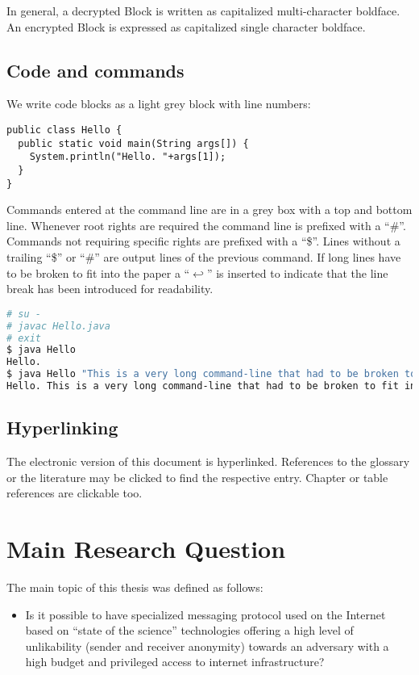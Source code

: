 In general, a decrypted Block is written as capitaliz\-ed multi-cha\-rac\-ter boldface. An encrypted Block is expressed as capitalized sing\-le cha\-rac\-ter boldface.

\section{Code and commands}
We write code blocks as a light grey block with line numbers:

\begin{lstlisting}
public class Hello {
  public static void main(String args[]) {
    System.println("Hello. "+args[1]);
  }
}
\end{lstlisting}

Commands entered at the command line are in a grey box with a top and bottom line. Whenever root rights are required the command line is prefixed with a ``\#''. Commands not requiring specific rights are prefixed with a ``\$''. Lines without a trailing ``\$'' or ``\#'' are output lines of the previous command. If long lines have to be broken to fit into the paper a ``$\hookleftarrow$'' is inserted to indicate that the line break has been introduced for readability.

\begin{lstlisting}[language=bash]
# su -
# javac Hello.java 
# exit
$ java Hello
Hello.
$ java Hello "This is a very long command-line that had to be broken to fit into the code box displayed on this page."
Hello. This is a very long command-line that had to be broken to fit into the code box displayed on this page.
\end{lstlisting}

\section{Hyperlinking}
The electronic version of this document is hyperlinked. References to the glossary or the literature may be clicked to find the respective entry. Chapter or table references are clickable too. 

\chapter{Main Research Question}
The main topic of this thesis was defined as follows:
\begin{itemize}
	\item Is it possible to have specialized messaging protocol used on the Internet based on ``state of the science'' technologies offering a high level of unlikability (sender and receiver anonymity) towards an adversary with a high budget and privileged access to internet infrastructure?
\end{itemize}


